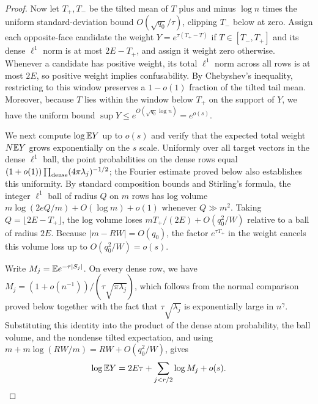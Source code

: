 \begin{proof}
Now let \(T_+,T_-\) be the tilted mean of \(T\) plus and minus \(\log n\)
times the uniform standard-deviation bound \(O(\sqrt{q_0}/\tau)\), clipping
\(T_-\) below at zero. Assign each opposite-face candidate the weight
\(Y=e^{\tau(T_+-T)}\) if \(T\in[T_-,T_+]\) and its dense \(\ell^1\) norm
is at most \(2E-T_+\), and assign it weight zero otherwise. Whenever a
candidate has positive weight, its total \(\ell^1\) norm across all rows is at
most \(2E\), so positive weight implies confusability. By Chebyshev's
inequality, restricting to this window preserves a \(1-o(1)\) fraction of the
tilted tail mean. Moreover, because \(T\) lies within the window below \(T_+\)
on the support of \(Y\), we have the uniform bound
\(\sup Y\le e^{O(\sqrt{q_0}\log n)}=e^{o(s)}\).

We next compute \(\log\mathbb E Y\) up to \(o(s)\) and verify that the expected
total weight \(N\mathbb E Y\) grows exponentially on the \(s\) scale. Uniformly over
all target vectors in the dense \(\ell^1\) ball, the point probabilities on the
dense rows equal \((1+o(1))\prod_{\rm dense}(4\pi\lambda_j)^{-1/2}\); the
Fourier estimate proved below also establishes this uniformity. By standard
composition bounds and Stirling's formula, the integer \(\ell^1\) ball of
radius \(Q\) on \(m\) rows has log volume
\(m\log(2eQ/m)+O(\log m)+o(1)\) whenever \(Q\gg m^2\). Taking
\(Q=\lfloor 2E-T_+\rfloor\), the log volume loses
\(mT_+/(2E)+O(q_0^2/W)\) relative to a ball of radius \(2E\). Because
\(|m-RW|=O(q_0)\), the factor \(e^{\tau T_+}\) in the weight cancels this
volume loss up to \(O(q_0^2/W)=o(s)\).

Write \(M_j=\mathbb E e^{-\tau|S_j|}\). On every dense row, we have
\(M_j=(1+o(n^{-1}))/(\tau\sqrt{\pi\lambda_j})\), which follows from the
normal comparison proved below together with the fact that
\(\tau\sqrt{\lambda_j}\) is exponentially large in \(n^\gamma\).
Substituting this identity into the product of the dense atom probability, the
ball volume, and the nondense tilted expectation, and using
\(m+m\log(RW/m)=RW+O(q_0^2/W)\), gives
\[
 \log\mathbb E Y=2E\tau+\sum_{j<r/2}\log M_j+o(s).
\]


\end{proof}
